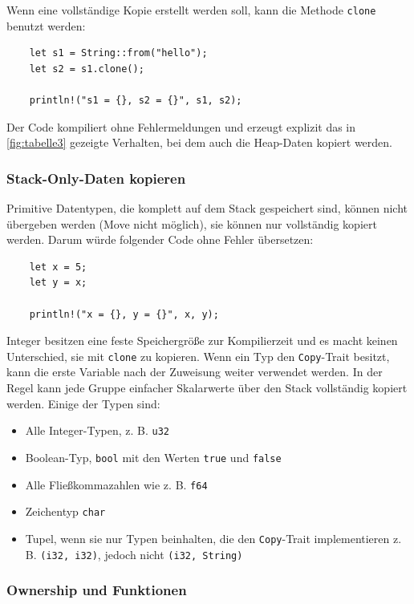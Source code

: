 Wenn eine vollständige Kopie erstellt werden soll, kann die Methode \verb"clone" benutzt werden:

\begin{lstlisting}
    let s1 = String::from("hello");
    let s2 = s1.clone();

    println!("s1 = {}, s2 = {}", s1, s2);
\end{lstlisting}

Der Code kompiliert ohne Fehlermeldungen und erzeugt explizit das in \autoref{fig:tabelle3} gezeigte Verhalten, bei dem auch die Heap-Daten kopiert werden.

\subsubsection{Stack-Only-Daten kopieren}

Primitive Datentypen, die komplett auf dem Stack gespeichert sind, können nicht übergeben werden (Move nicht möglich), sie können nur vollständig kopiert werden. Darum würde folgender Code ohne Fehler übersetzen:

\begin{lstlisting}
    let x = 5;
    let y = x;

    println!("x = {}, y = {}", x, y);
\end{lstlisting}

Integer besitzen eine feste Speichergröße zur Kompilierzeit und es macht keinen Unterschied, sie mit \verb"clone" zu kopieren. Wenn ein Typ den \verb"Copy"-Trait besitzt, kann die erste Variable nach der Zuweisung weiter verwendet werden. In der Regel kann jede Gruppe einfacher Skalarwerte über den Stack vollständig kopiert werden. Einige der Typen sind:

\begin{itemize}
    \item Alle Integer-Typen, z. B. \verb"u32"
    \item Boolean-Typ, \verb"bool" mit den Werten \verb"true" und \verb"false"
    \item Alle Fließkommazahlen wie z. B. \verb"f64"
    \item Zeichentyp \verb"char"
    \item Tupel, wenn sie nur Typen beinhalten, die den \verb"Copy"-Trait implementieren z. B. \verb"(i32, i32)", jedoch nicht \verb"(i32, String)"
\end{itemize}

\subsubsection{Ownership und Funktionen}

